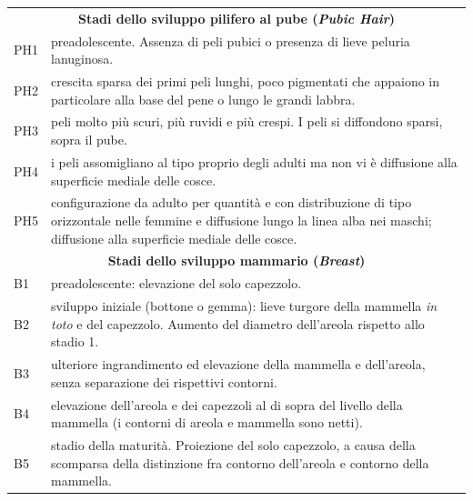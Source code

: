 \begin{table}[!h]
\begin{tabular}{lp{13.3cm}}
\toprule
\multicolumn{2}{c}{\textbf{Stadi dello sviluppo pilifero al pube (\emph{Pubic Hair})}}\\
PH1 &	preadolescente. Assenza di peli pubici o presenza di lieve peluria lanuginosa.\\
PH2 &	crescita sparsa dei primi peli lunghi, poco pigmentati che appaiono 
		in particolare alla base del pene o lungo le grandi labbra.\\
PH3 &	peli molto più scuri, più ruvidi e più crespi. 
		I peli si diffondono sparsi, sopra il pube.\\
PH4 &	i peli assomigliano al tipo proprio degli adulti ma non vi è diffusione 
		alla superficie mediale delle cosce.\\
PH5 &	configurazione da adulto per quantità e con distribuzione di tipo 
		orizzontale nelle femmine e diffusione lungo la linea
		alba nei maschi; diffusione alla superficie mediale delle cosce.\\
\midrule
\multicolumn{2}{c}{\textbf{Stadi dello sviluppo mammario (\emph{Breast})}}\\
B1 &	preadolescente: elevazione del solo capezzolo.\\
B2 &	sviluppo iniziale (bottone o gemma): lieve turgore della mammella \emph{in toto} e del capezzolo. 
		Aumento del diametro dell'areola rispetto allo stadio 1.\\
B3 &	ulteriore ingrandimento ed elevazione della mammella e dell'areola, senza separazione dei rispettivi contorni.\\
B4 &	elevazione dell'areola e dei capezzoli al di sopra del livello della mammella 
		(i contorni di areola e mammella sono netti).\\
B5 &	stadio della maturità. Proiezione del solo capezzolo, a causa 
		della scomparsa della distinzione fra contorno 
		dell'areola e contorno della mammella.\\

\end{tabular}
\end{table}
